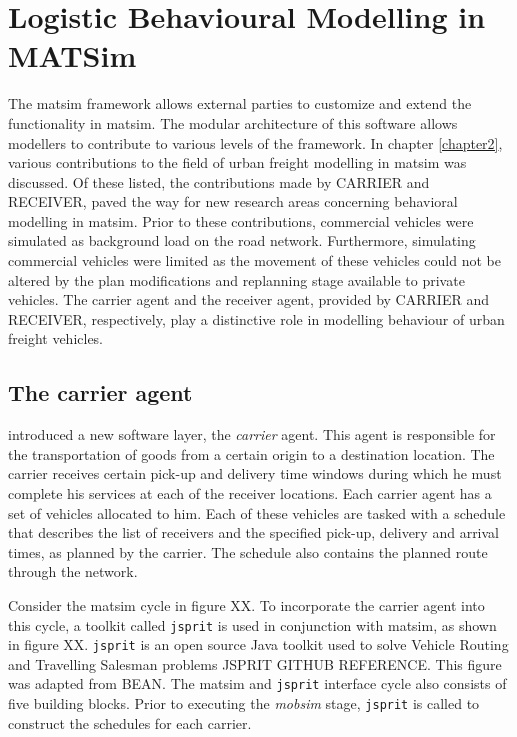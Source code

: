   

\section{Logistic Behavioural Modelling in MATSim}
 The \acrshort{matsim} framework allows external parties to customize and extend the functionality in \acrshort{matsim}. The modular architecture of this software allows modellers to contribute to various levels of the framework. In chapter \ref{chapter2}, various contributions to the field of urban freight modelling in \acrshort{matsim} was discussed.
  Of these listed, the contributions made by CARRIER and RECEIVER, paved the way for new research areas concerning behavioral modelling in \acrshort{matsim}. Prior to these contributions, commercial vehicles were simulated as background load on the road network. Furthermore, simulating commercial vehicles were limited as the movement of these vehicles could not be altered by the plan modifications and replanning stage available to private vehicles. The carrier agent and the receiver agent, provided by CARRIER and RECEIVER, respectively,  play a distinctive role in modelling behaviour of urban freight vehicles.


\subsection{The carrier agent}
\citet{schroeder2012towards} introduced a new software layer, the \textit{carrier} agent. This agent is responsible for the transportation of goods from a certain origin to a destination location. The carrier receives certain pick-up and delivery time windows during which he must complete his services at each of the receiver locations. Each carrier agent has a set of vehicles allocated to him. Each of these vehicles are tasked with a schedule that describes the list of receivers and the specified pick-up, delivery and arrival times, as planned by the carrier. The schedule also contains the planned route through the network.\par

Consider the \acrshort{matsim} cycle in figure XX. To incorporate the carrier agent into this cycle, a toolkit called \texttt{jsprit} is used in conjunction with \acrshort{matsim}, as shown in figure XX. \texttt{jsprit} is an open source Java toolkit used to solve Vehicle Routing and Travelling Salesman problems JSPRIT GITHUB REFERENCE.  This figure was adapted from BEAN. The \acrshort{matsim} and \texttt{jsprit} interface cycle also consists of five building blocks. Prior to executing the \textit{mobsim} stage, \texttt{jsprit} is called to construct the schedules for each carrier.
 \par

